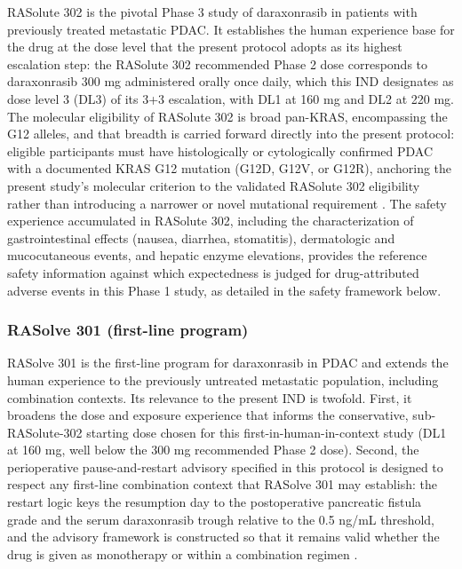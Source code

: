 RASolute 302 is the pivotal Phase 3 study of daraxonrasib in patients with
previously treated metastatic PDAC. It establishes the human experience base for
the drug at the dose level that the present protocol adopts as its highest
escalation step: the RASolute 302 recommended Phase 2 dose corresponds to
daraxonrasib 300 mg administered orally once daily, which this IND designates as
dose level 3 (DL3) of its 3+3 escalation, with DL1 at 160 mg and DL2 at 220 mg.
The molecular eligibility of RASolute 302 is broad pan-KRAS, encompassing the G12
alleles, and that breadth is carried forward directly into the present protocol:
eligible participants must have histologically or cytologically confirmed PDAC
with a documented KRAS G12 mutation (G12D, G12V, or G12R), anchoring the present
study's molecular criterion to the validated RASolute 302 eligibility rather than
introducing a narrower or novel mutational requirement \cite{daraxwhipple}. The
safety experience accumulated in RASolute 302, including the characterization of
gastrointestinal effects (nausea, diarrhea, stomatitis), dermatologic and
mucocutaneous events, and hepatic enzyme elevations, provides the reference safety
information against which expectedness is judged for drug-attributed adverse events
in this Phase 1 study, as detailed in the safety framework below.

\subsubsection*{RASolve 301 (first-line program)}

RASolve 301 is the first-line program for daraxonrasib in PDAC and extends the
human experience to the previously untreated metastatic population, including
combination contexts. Its relevance to the present IND is twofold. First, it
broadens the dose and exposure experience that informs the conservative,
sub-RASolute-302 starting dose chosen for this first-in-human-in-context study
(DL1 at 160 mg, well below the 300 mg recommended Phase 2 dose). Second, the
perioperative pause-and-restart advisory specified in this protocol is designed to
respect any first-line combination context that RASolve 301 may establish: the
restart logic keys the resumption day to the postoperative pancreatic fistula
grade and the serum daraxonrasib trough relative to the 0.5 ng/mL threshold, and
the advisory framework is constructed so that it remains valid whether the drug is
given as monotherapy or within a combination regimen \cite{daraxwhipple,
onpremwhippl}.

